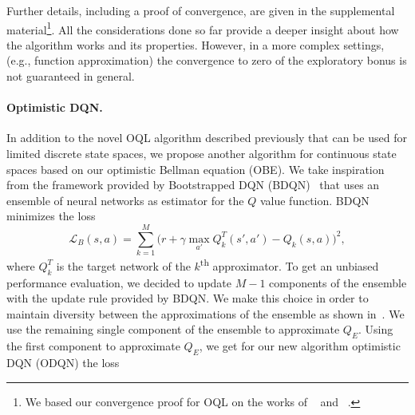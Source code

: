 Further details, including a proof of convergence, are given in the supplemental material\footnote{We based our convergence proof for OQL on the works of \citeauthor{melo2001convergence}~ and \citeauthor{jaakkola1994convergence}~.}.
All the considerations done so far provide a deeper insight about how the algorithm works and its properties. However, in a more complex settings, (e.g., function approximation) the convergence to zero of the exploratory bonus is not guaranteed in general.

\paragraph{Optimistic DQN.}
\label{sec:proposedalg}

In addition to the novel OQL algorithm described previously that can be used for limited discrete state spaces, we
propose another algorithm for continuous state spaces based on our optimistic Bellman equation
(OBE). We take inspiration from the framework provided by Bootstrapped DQN (BDQN)~\cite{osband2016deep}
that uses an ensemble of neural networks as estimator for the $Q$ value function.
BDQN minimizes the loss
\begin{equation}
	\mathcal{L}_B(s,a)\! = \! \sum_{k=1}^M \bigg(r + \gamma \max_{a'}Q_k^T(s',a') - Q_k(s,a)\bigg)^2, \nonumber
\end{equation}
where $Q_k^T$ is the target network of the $k$\textsuperscript{th} approximator. 
To get an unbiased performance evaluation, we decided to update $M-1$ components of the ensemble with the update rule provided by BDQN. We make this choice in order to maintain diversity between the approximations of the ensemble as shown in~\cite{osband2016deep}. We use the remaining single component of the ensemble to approximate $Q_E$. Using the first component to approximate $Q_E$, we get for our new algorithm optimistic DQN (ODQN) the loss
